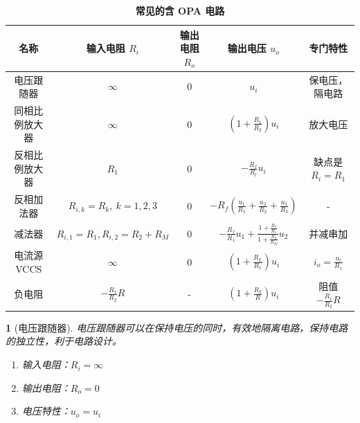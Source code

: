 \documentclass[UTF8]{report}
\theoremstyle{MyLineTheoremStyle} %
\theoremstyle{MyBlockTheoremStyle} %
\theoremstyle{MySubsubsectionStyle} %
\newtheorem{definition}{}
\begin{document}
\begin{table}[H]
    \centering
    \caption{\textbf{常见的含 OPA 电路}}
    \begin{tabular}{ccccc} 
    \toprule
    名称         & 输入电阻 $R_i$ & 输出电阻 $R_o$ & 输出电压 $u_o$ & 专门特性  \\
    \hline
    电压跟随器      &   $\infty$   &    0  &   $u_i$   &   保电压，隔电路    \\
    同相比例放大器    &   $\infty$    &  0    &   $(1+\frac{R_1}{R_2})u_i$   &   放大电压    \\
    反相比例放大器    &    $R_1$  &   0   &  $-\frac{R_f}{R_l}u_i$    &  缺点是 $R_i = R_1$     \\
    反相加法器      &   $R_{i,k} = R_k,\ k = 1,2,3$   &   0   &   $-R_f\left( \frac{u_1}{R_1} + \frac{u_2}{R_2} + \frac{u_3}{R_3} \right)$   &    -   \\
    减法器        &   {\small $R_{i,1} = R_1, R_{i,2} = R_2 + R_M$}   &   0   &   $-\frac{R_f}{R_1}u_1 + \frac{1+\frac{R_f}{R_1}}{ 1 + \frac{R_2}{R_M}}u_2$   &  并减串加      \\
    电流源 VCCS &   $\infty$    &    0  &   $\left(  1+\frac{R_L}{R_1} \right)u_i$   &   $i_o = \frac{u_i}{R_1}$    \\
    负电阻        &   $-\frac{R_1}{R_2}R$   &   -   &   $\left(  1+\frac{R_2}{R} \right)u_i$   &    阻值  $-\frac{R_1}{R_2}R$  \\
    \bottomrule
    \end{tabular}
\end{table}

\begin{definition}[电压跟随器]
电压跟随器可以在保持电压的同时，有效地隔离电路，保持电路的独立性，利于电路设计。
\begin{enumerate}
\item 输入电阻：$R_i = \infty$
\item 输出电阻：$R_o = 0$
\item 电压特性：$u_o = u_i$
\end{enumerate}
\end{definition}
\end{document}
